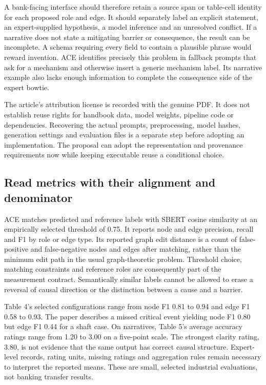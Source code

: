 A bank-facing interface should therefore retain a source span or table-cell identity for each proposed role and edge. It should separately label an explicit statement, an expert-supplied hypothesis, a model inference and an unresolved conflict. If a narrative does not state a mitigating barrier or consequence, the result can be incomplete. A schema requiring every field to contain a plausible phrase would reward invention. ACE identifies precisely this problem in fallback prompts that ask for a mechanism and otherwise insert a generic mechanism label. Its narrative example also lacks enough information to complete the consequence side of the expert bowtie.~\citep{exec21_ace}

The article's attribution license is recorded with the genuine PDF. It does not establish reuse rights for handbook data, model weights, pipeline code or dependencies. Recovering the actual prompts, preprocessing, model hashes, generation settings and evaluation files is a separate step before adopting an implementation. The proposal can adopt the representation and provenance requirements now while keeping executable reuse a conditional choice.

\subsection{Read metrics with their alignment and denominator}
\label{exec21:ace-metrics}
ACE matches predicted and reference labels with SBERT cosine similarity at an empirically selected threshold of 0.75. It reports node and edge precision, recall and F1 by role or edge type. Its reported graph edit distance is a count of false-positive and false-negative nodes and edges after matching, rather than the minimum edit path in the usual graph-theoretic problem. Threshold choice, matching constraints and reference roles are consequently part of the measurement contract. Semantically similar labels cannot be allowed to erase a reversal of causal direction or the distinction between a cause and a barrier.~\citep{exec21_ace}

Table 4's selected configurations range from node F1 0.81 to 0.94 and edge F1 0.58 to 0.93. The paper describes a missed critical event yielding node F1 0.80 but edge F1 0.44 for a shaft case. On narratives, Table 5's average accuracy ratings range from 1.20 to 3.00 on a five-point scale. The strongest clarity rating, 3.80, is not evidence that the same output has correct causal structure. Expert-level records, rating units, missing ratings and aggregation rules remain necessary to interpret the reported means. These are small, selected industrial evaluations, not banking transfer results.~\citep{exec21_ace}

